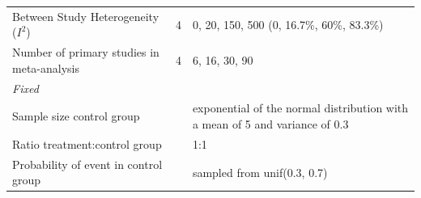 \documentclass[
  english,
  doc,floatsintext,draftall]{apa6}
\begin{document}
\begin{longtable}[]{@{}lll@{}}
\begin{minipage}[t]{0.37\columnwidth}\raggedright
Between Study Heterogeneity (\(I^2\))\strut
\end{minipage} & \begin{minipage}[t]{0.12\columnwidth}\raggedright
4\strut
\end{minipage} & \begin{minipage}[t]{0.43\columnwidth}\raggedright
0, 20, 150, 500 (0, 16.7\%, 60\%, 83.3\%)\strut
\end{minipage}\tabularnewline
\begin{minipage}[t]{0.37\columnwidth}\raggedright
Number of primary studies in meta-analysis\strut
\end{minipage} & \begin{minipage}[t]{0.12\columnwidth}\raggedright
4\strut
\end{minipage} & \begin{minipage}[t]{0.43\columnwidth}\raggedright
6, 16, 30, 90\strut
\end{minipage}\tabularnewline
\begin{minipage}[t]{0.37\columnwidth}\raggedright
\emph{Fixed}\strut
\end{minipage} & \begin{minipage}[t]{0.12\columnwidth}\raggedright
\strut
\end{minipage} & \begin{minipage}[t]{0.43\columnwidth}\raggedright
\strut
\end{minipage}\tabularnewline
\begin{minipage}[t]{0.37\columnwidth}\raggedright
Sample size control group\strut
\end{minipage} & \begin{minipage}[t]{0.12\columnwidth}\raggedright
\strut
\end{minipage} & \begin{minipage}[t]{0.43\columnwidth}\raggedright
exponential of the normal distribution with a mean of 5 and variance of 0.3\strut
\end{minipage}\tabularnewline
\begin{minipage}[t]{0.37\columnwidth}\raggedright
Ratio treatment:control group\strut
\end{minipage} & \begin{minipage}[t]{0.12\columnwidth}\raggedright
\strut
\end{minipage} & \begin{minipage}[t]{0.43\columnwidth}\raggedright
1:1\strut
\end{minipage}\tabularnewline
\begin{minipage}[t]{0.37\columnwidth}\raggedright
Probability of event in control group\strut
\end{minipage} & \begin{minipage}[t]{0.12\columnwidth}\raggedright
\strut
\end{minipage} & \begin{minipage}[t]{0.43\columnwidth}\raggedright
sampled from unif(0.3, 0.7)\strut
\end{minipage}\tabularnewline
\bottomrule
\end{longtable}
\end{document}
